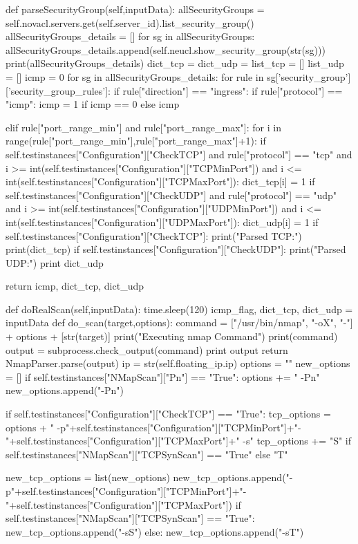 \begin{python}
	def parseSecurityGroup(self,inputData):
		allSecurityGroups = self.novacl.servers.get(self.server_id).list_security_group()
		allSecurityGroups_details = []
		for sg in allSecurityGroups:
			allSecurityGroups_details.append(self.neucl.show_security_group(str(sg)))
		print(allSecurityGroups_details)
		dict_tcp = {}
		dict_udp = {}
		list_tcp = []
		list_udp = []
		icmp = 0
		for sg in allSecurityGroups_details:
			for rule in sg['security_group']['security_group_rules']:
				if rule["direction"] == "ingress":
					if rule["protocol"] == "icmp":
						icmp = 1 if icmp == 0 else icmp
					
					elif rule["port_range_min"] and rule["port_range_max"]:
						for i in range(rule["port_range_min"],rule["port_range_max"]+1):
							if self.testinstances["Configuration"]["CheckTCP"] and rule["protocol"] == "tcp" and i >= int(self.testinstances["Configuration"]["TCPMinPort"]) and i <= int(self.testinstances["Configuration"]["TCPMaxPort"]):
								dict_tcp[i] = 1
							if self.testinstances["Configuration"]["CheckUDP"] and rule["protocol"] == "udp" and i >= int(self.testinstances["Configuration"]["UDPMinPort"]) and i <= int(self.testinstances["Configuration"]["UDPMaxPort"]):	
								dict_udp[i] = 1
		if self.testinstances["Configuration"]["CheckTCP"]:
			print("Parsed TCP:")
			print(dict_tcp)
		if self.testinstances["Configuration"]["CheckUDP"]:
			print("Parsed UDP:")
			print dict_udp

		return icmp, dict_tcp, dict_udp

	def doRealScan(self,inputData):
		time.sleep(120)
		icmp_flag, dict_tcp, dict_udp = inputData
		def do_scan(target,options):
			command = ["/usr/bin/nmap", "-oX", "-"] + options + [str(target)]
			print("Executing nmap Command")
			print(command)
			output = subprocess.check_output(command)
			print output
			return NmapParser.parse(output)
		ip = str(self.floating_ip.ip)
		options = ""
		new_options = []
		if self.testinstances["NMapScan"]["Pn"] == "True":
			options += " -Pn"
			new_options.append("-Pn")

		if self.testinstances["Configuration"]["CheckTCP"] == "True":
			tcp_options = options + " -p"+self.testinstances["Configuration"]["TCPMinPort"]+"-"+self.testinstances["Configuration"]["TCPMaxPort"]+" -s"
			tcp_options += "S" if self.testinstances["NMapScan"]["TCPSynScan"] == "True" else "T"
			
			new_tcp_options = list(new_options)
			new_tcp_options.append("-p"+self.testinstances["Configuration"]["TCPMinPort"]+"-"+self.testinstances["Configuration"]["TCPMaxPort"])
			if self.testinstances["NMapScan"]["TCPSynScan"] == "True":
				new_tcp_options.append("-sS")
			else:
				new_tcp_options.append("-sT")


\end{python}
